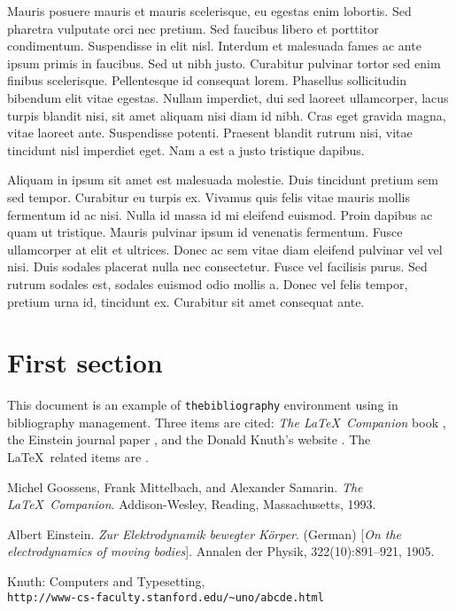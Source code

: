 \documentclass[12pt, letterpaper,twocolumn]{article}
\begin{document}
Mauris posuere mauris et mauris scelerisque, eu egestas enim lobortis. Sed pharetra vulputate orci nec pretium. Sed faucibus libero et porttitor condimentum. Suspendisse in elit nisl. Interdum et malesuada fames ac ante ipsum primis in faucibus. Sed ut nibh justo. Curabitur pulvinar tortor sed enim finibus scelerisque. Pellentesque id consequat lorem. Phasellus sollicitudin bibendum elit vitae egestas. Nullam imperdiet, dui sed laoreet ullamcorper, lacus turpis blandit nisi, sit amet aliquam nisi diam id nibh. Cras eget gravida magna, vitae laoreet ante. Suspendisse potenti. Praesent blandit rutrum nisi, vitae tincidunt nisl imperdiet eget. Nam a est a justo tristique dapibus.

Aliquam in ipsum sit amet est malesuada molestie. Duis tincidunt pretium sem sed tempor. Curabitur eu turpis ex. Vivamus quis felis vitae mauris mollis fermentum id ac nisi. Nulla id massa id mi eleifend euismod. Proin dapibus ac quam ut tristique. Mauris pulvinar ipsum id venenatis fermentum. Fusce ullamcorper at elit et ultrices. Donec ac sem vitae diam eleifend pulvinar vel vel nisi. Duis sodales placerat nulla nec consectetur. Fusce vel facilisis purus. Sed rutrum sodales est, sodales euismod odio mollis a. Donec vel felis tempor, pretium urna id, tincidunt ex. Curabitur sit amet consequat ante.


\section{First section}
 
This document is an example of \texttt{thebibliography} environment using 
in bibliography management. Three items are cited: \textit{The \LaTeX\ Companion} 
book \cite{latexcompanion}, the Einstein journal paper \cite{einstein}, and the 
Donald Knuth's website \cite{knuthwebsite}. The \LaTeX\ related items are
\cite{latexcompanion,knuthwebsite}. 
 
\medskip


\begin{thebibliography}{9}
Michel Goossens, Frank Mittelbach, and Alexander Samarin. 
\textit{The \LaTeX\ Companion}. 
Addison-Wesley, Reading, Massachusetts, 1993.
 
Albert Einstein. 
\textit{Zur Elektrodynamik bewegter K{\"o}rper}. (German) 
[\textit{On the electrodynamics of moving bodies}]. 
Annalen der Physik, 322(10):891–921, 1905.
 
Knuth: Computers and Typesetting,
\\\texttt{http://www-cs-faculty.stanford.edu/\~{}uno/abcde.html}
\end{thebibliography}

\end{document}
